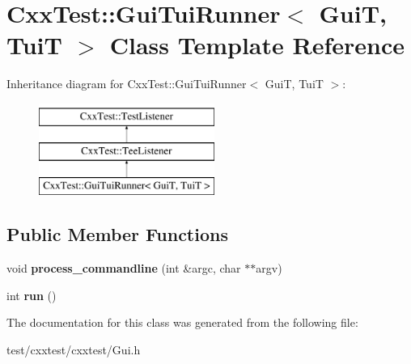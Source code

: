 \hypertarget{classCxxTest_1_1GuiTuiRunner}{\section{Cxx\-Test\-:\-:Gui\-Tui\-Runner$<$ Gui\-T, Tui\-T $>$ Class Template Reference}
\label{classCxxTest_1_1GuiTuiRunner}
}
Inheritance diagram for Cxx\-Test\-:\-:Gui\-Tui\-Runner$<$ Gui\-T, Tui\-T $>$\-:\begin{figure}[H]
\begin{center}
\leavevmode
\includegraphics[height=3.000000cm]{classCxxTest_1_1GuiTuiRunner}
\end{center}
\end{figure}
\subsection*{Public Member Functions}
\begin{DoxyCompactItemize}
\item 
\hypertarget{classCxxTest_1_1GuiTuiRunner_aa39b6cfae38d56203251af38cafa4640}{void {\bfseries process\-\_\-commandline} (int \&argc, char $\ast$$\ast$argv)}\label{classCxxTest_1_1GuiTuiRunner_aa39b6cfae38d56203251af38cafa4640}

\item 
\hypertarget{classCxxTest_1_1GuiTuiRunner_a0408e6e7a9768dd9dcca699b1c172552}{int {\bfseries run} ()}\label{classCxxTest_1_1GuiTuiRunner_a0408e6e7a9768dd9dcca699b1c172552}

\end{DoxyCompactItemize}


The documentation for this class was generated from the following file\-:\begin{DoxyCompactItemize}
\item 
test/cxxtest/cxxtest/Gui.\-h\end{DoxyCompactItemize}
